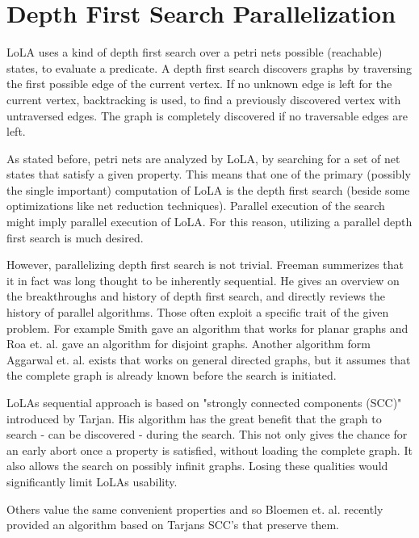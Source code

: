 \section{Depth First Search Parallelization}
LoLA uses a kind of depth first search over a petri nets possible (reachable) states, to evaluate a predicate. A depth first search discovers graphs\cite[chapter~1]{bondy1976graph} by traversing the first possible edge of the current vertex. If no unknown edge is left for the current vertex, backtracking\cite{golomb1965backtrack} is used, to find a previously discovered vertex with untraversed edges. The graph is completely discovered if no traversable edges are left.

As stated before, petri nets are analyzed by LoLA, by searching for a set of net states that satisfy a given property. This means that one of the primary (possibly the single important) computation of LoLA is the depth first search (beside some optimizations like net reduction techniques). Parallel execution of the search might imply parallel execution of LoLA. For this reason, utilizing a parallel depth first search is much desired.

However, parallelizing depth first search is not trivial. Freeman summerizes that it in fact was long thought to be inherently sequential\cite{freeman1991parallel}. He gives an overview on the breakthroughs and history of depth first search, and  directly reviews the history of parallel algorithms. Those often exploit a specific trait of the given problem. For example Smith gave an algorithm that works for planar graphs\cite{smith1986parallel} and Roa et. al. gave an algorithm for disjoint graphs\cite{rao1987parallel}. Another algorithm form Aggarwal et. al. exists that works on general directed graphs\cite{Aggarwal:1989:PDS:73007.73035}, but it assumes that the complete graph is already known before the search is initiated.

LoLAs sequential approach is based on "strongly connected components (SCC)" introduced by Tarjan\cite{tarjan1972depth}. His algorithm has the great benefit that the graph to search - can be discovered - during the search. This not only gives the chance for an early abort once a property is satisfied, without loading the complete graph. It also allows the search on possibly infinit graphs. Losing these qualities would significantly limit LoLAs usability.

Others value the same convenient properties and so Bloemen et. al. recently provided an algorithm based on Tarjans SCC's that preserve them\cite{bloemen2016multi}.

